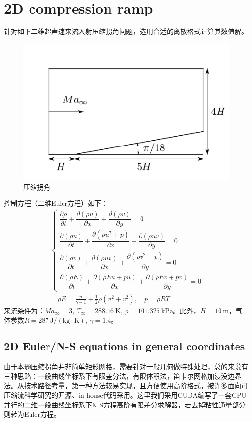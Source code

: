 \documentclass[11pt]{article}
\begin{document}
\section{2D compression ramp}
针对如下二维超声速来流入射压缩拐角问题，选用合适的离散格式计算其数值解。
\begin{figure}[htbp]
	\centering
	\includegraphics[width=.5\linewidth]{figure/sketch/ramp.pdf}
	\caption{\label{fig:ramp}压缩拐角}
\end{figure}

控制方程（二维Euler方程）如下：
\begin{align}
	 & \left\{\begin{array}{l}
		\dfrac{\partial\rho}{\partial t}+\dfrac{\partial(\rho u)}{\partial x}+\dfrac{\partial(\rho v)}{\partial y}=0           \\[8pt]
		\dfrac{\partial(\rho u)}{\partial t}+\dfrac{\partial(\rho u^2+p)}{\partial x}+\dfrac{\partial(\rho u v)}{\partial y}=0 \\[8pt]
		\dfrac{\partial(\rho v)}{\partial t}+\dfrac{\partial(\rho uv)}{\partial x}+\dfrac{\partial(\rho v^2+p)}{\partial y}=0  \\[8pt]
		\dfrac{\partial(\rho E)}{\partial t}+\dfrac{\partial(\rho Eu+pu)}{\partial x}+\dfrac{\partial(\rho Ev+pv)}{\partial y}=0
	\end{array}\right., \label{eqn:euler2}              \\
	 & \quad \rho E=\frac{p}{\gamma-1}+\frac{1}{2}\rho(u^2+v^2),\quad p=\rho R T
\end{align}
来流条件为：$Ma_\infty=3,\ T_\infty=288.16\ \mathrm{K},\ p=101.325\ \mathrm{kPa}$。此外，$H=10\ \mathrm{m}$，气体参数$R=287\ \mathrm{J/(kg\cdot K)},\ \gamma=1.4$。

\subsection{2D Euler/N-S equations in general coordinates}
由于本题压缩拐角并非简单矩形网格，需要针对一般几何做特殊处理，总的来说有三种思路：一般曲线坐标系下有限差分法，有限体积法，笛卡尔网格加浸没边界法。从技术路径考量，第一种方法较易实现，且方便使用高阶格式，被许多面向可压缩流科学研究的开源、in-house代码采用。这里我们采用CUDA编写了一套GPU并行的二维一般曲线坐标系下N-S方程高阶有限差分求解器，若去掉粘性通量部分则转为Euler方程。
\end{document}
